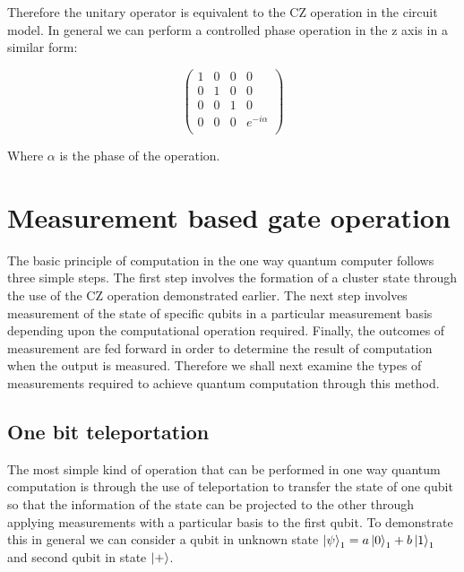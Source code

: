 Therefore the unitary operator is equivalent to the CZ operation in the circuit model. In general we can perform a controlled phase operation in the z axis in a similar form:

\begin{equation}
\begin{pmatrix}
1 & 0 & 0 & 0 \\
0 & 1 & 0 & 0 \\
0 & 0 & 1 & 0 \\
0 & 0 & 0 & e^{-i \alpha} \\
\end{pmatrix}
\end{equation}

Where $\alpha$ is the phase of the operation.



\section{Measurement based gate operation}

The basic principle of computation in the one way quantum computer follows three simple steps. The first step involves the formation of a cluster state through the use of the CZ operation demonstrated earlier. The next step involves measurement of the state of specific qubits in a particular measurement basis depending upon the computational operation required. Finally, the outcomes of measurement are fed forward in order to determine the result of computation when the output is measured. Therefore we shall next examine the types of measurements required to achieve quantum computation through this method.


\subsection{One bit teleportation}

The most simple kind of operation that can be performed in one way quantum computation is through the use of teleportation to transfer the state of one qubit so that the information of the state can be projected to the other through applying measurements with a particular basis to the first qubit. To demonstrate this in general we can consider a qubit in unknown state $\ket{\psi}_{1} = a \ket{0}_{1} + b \ket{1}_{1}$ and second qubit in state $\ket{+}$. 

